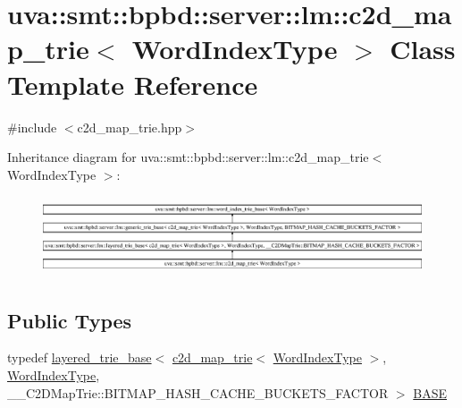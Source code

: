 \hypertarget{classuva_1_1smt_1_1bpbd_1_1server_1_1lm_1_1c2d__map__trie}{}\section{uva\+:\+:smt\+:\+:bpbd\+:\+:server\+:\+:lm\+:\+:c2d\+\_\+map\+\_\+trie$<$ Word\+Index\+Type $>$ Class Template Reference}
\label{classuva_1_1smt_1_1bpbd_1_1server_1_1lm_1_1c2d__map__trie}


{\ttfamily \#include $<$c2d\+\_\+map\+\_\+trie.\+hpp$>$}

Inheritance diagram for uva\+:\+:smt\+:\+:bpbd\+:\+:server\+:\+:lm\+:\+:c2d\+\_\+map\+\_\+trie$<$ Word\+Index\+Type $>$\+:\begin{figure}[H]
\begin{center}
\leavevmode
\includegraphics[height=2.388060cm]{classuva_1_1smt_1_1bpbd_1_1server_1_1lm_1_1c2d__map__trie}
\end{center}
\end{figure}
\subsection*{Public Types}
\begin{DoxyCompactItemize}
\item 
typedef \hyperlink{classuva_1_1smt_1_1bpbd_1_1server_1_1lm_1_1layered__trie__base}{layered\+\_\+trie\+\_\+base}$<$ \hyperlink{classuva_1_1smt_1_1bpbd_1_1server_1_1lm_1_1c2d__map__trie}{c2d\+\_\+map\+\_\+trie}$<$ \hyperlink{classuva_1_1smt_1_1bpbd_1_1server_1_1lm_1_1word__index__trie__base_a64279b5b94c421b25aedaa72e73d013c}{Word\+Index\+Type} $>$, \hyperlink{classuva_1_1smt_1_1bpbd_1_1server_1_1lm_1_1word__index__trie__base_a64279b5b94c421b25aedaa72e73d013c}{Word\+Index\+Type}, \+\_\+\+\_\+\+C2\+D\+Map\+Trie\+::\+B\+I\+T\+M\+A\+P\+\_\+\+H\+A\+S\+H\+\_\+\+C\+A\+C\+H\+E\+\_\+\+B\+U\+C\+K\+E\+T\+S\+\_\+\+F\+A\+C\+T\+O\+R $>$ \hyperlink{classuva_1_1smt_1_1bpbd_1_1server_1_1lm_1_1c2d__map__trie_aed8a7e183010a24bd3dfa02661fb58ca}{B\+A\+S\+E}
\end{DoxyCompactItemize}
